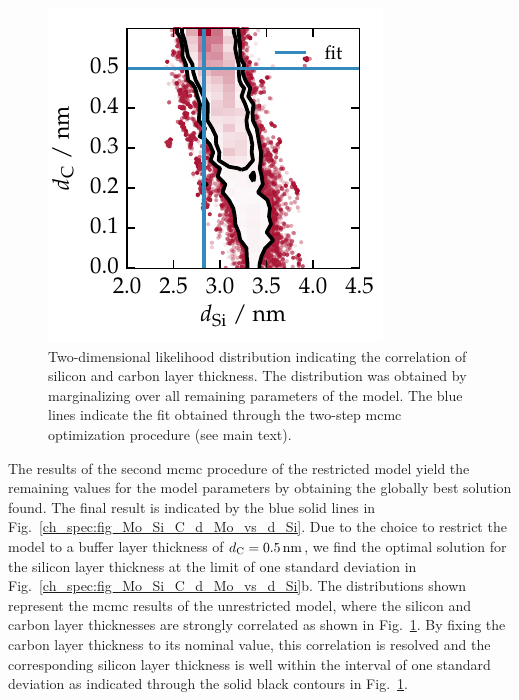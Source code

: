 \begin{figure}[htbp]
\centering
\includegraphics{img/Mo_Si_C_correlation_Si_C}
\caption{Two-dimensional likelihood distribution indicating the correlation of silicon and carbon layer thickness. The distribution was obtained by marginalizing over all remaining parameters of the model. The blue lines indicate the fit obtained through the two-step \gls{mcmc} optimization procedure (see main text).}
\label{ch_spec:fig_Mo_Si_C_correlation_Si_C}
\end{figure}
The results of the second \gls{mcmc} procedure of the restricted model yield the remaining values for the model parameters by obtaining the globally best solution found. The final result is indicated by the blue solid lines in Fig.~\ref{ch_spec:fig_Mo_Si_C_d_Mo_vs_d_Si}. Due to the choice to restrict the model to a buffer layer thickness of $d_\text{C} = \nm{0.5}$, we find the optimal solution for the silicon layer thickness at the limit of one standard deviation in Fig.~\ref{ch_spec:fig_Mo_Si_C_d_Mo_vs_d_Si}b. The distributions shown represent the \gls{mcmc} results of the unrestricted model, where the silicon and carbon layer thicknesses are strongly correlated as shown in Fig.~\ref{ch_spec:fig_Mo_Si_C_correlation_Si_C}. By fixing the carbon layer thickness to its nominal value, this correlation is resolved and the corresponding silicon layer thickness is well within the interval of one standard deviation as indicated through the solid black contours in Fig.~\ref{ch_spec:fig_Mo_Si_C_correlation_Si_C}.

